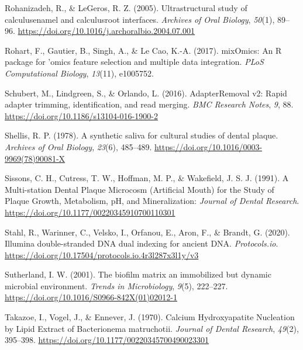 \documentclass[
  b5paper,
]{book}
\newlength{\cslhangindent}
\newenvironment{CSLReferences}[2] %
 {\begin{list}{}{%
  \setlength{\itemindent}{0pt}
  \setlength{\leftmargin}{0pt}
  \setlength{\parsep}{0pt}
  \ifodd #1
   \setlength{\leftmargin}{\cslhangindent}
   \setlength{\itemindent}{-1\cslhangindent}
  \fi
  \setlength{\itemsep}{#2\baselineskip}}}
 {\end{list}}
\begin{document}
\begin{CSLReferences}{1}{0}
Rohanizadeh, R., \& LeGeros, R. Z. (2005). Ultrastructural study of
calculus\textendash enamel and calculus\textendash root interfaces.
\emph{Archives of Oral Biology}, \emph{50}(1), 89--96.
\url{https://doi.org/10.1016/j.archoralbio.2004.07.001}

Rohart, F., Gautier, B., Singh, A., \& Le Cao, K.-A. (2017). {mixOmics}:
{An R} package for 'omics feature selection and multiple data
integration. \emph{PLoS Computational Biology}, \emph{13}(11), e1005752.

Schubert, M., Lindgreen, S., \& Orlando, L. (2016). {AdapterRemoval} v2:
Rapid adapter trimming, identification, and read merging. \emph{BMC
Research Notes}, \emph{9}, 88.
\url{https://doi.org/10.1186/s13104-016-1900-2}

Shellis, R. P. (1978). A synthetic saliva for cultural studies of dental
plaque. \emph{Archives of Oral Biology}, \emph{23}(6), 485--489.
\url{https://doi.org/10.1016/0003-9969(78)90081-X}

Sissons, C. H., Cutress, T. W., Hoffman, M. P., \& Wakefield, J. S. J.
(1991). A {Multi-station Dental Plaque Microcosm} ({Artificial Mouth})
for the {Study} of {Plaque Growth}, {Metabolism}, {pH}, and
{Mineralization}: \emph{Journal of Dental Research}.
\url{https://doi.org/10.1177/00220345910700110301}

Stahl, R., Warinner, C., Velsko, I., Orfanou, E., Aron, F., \& Brandt,
G. (2020). Illumina double-stranded {DNA} dual indexing for ancient
{DNA}. \emph{Protocols.io}.
\url{https://doi.org/10.17504/protocols.io.4r3l287x3l1y/v3}

Sutherland, I. W. (2001). The biofilm matrix \textendash{} an
immobilized but dynamic microbial environment. \emph{Trends in
Microbiology}, \emph{9}(5), 222--227.
\url{https://doi.org/10.1016/S0966-842X(01)02012-1}

Takazoe, I., Vogel, J., \& Ennever, J. (1970). Calcium {Hydroxyapatite
Nucleation} by {Lipid Extract} of {Bacterionema} matruchotii.
\emph{Journal of Dental Research}, \emph{49}(2), 395--398.
\url{https://doi.org/10.1177/00220345700490023301}


\end{CSLReferences}
\end{document}
